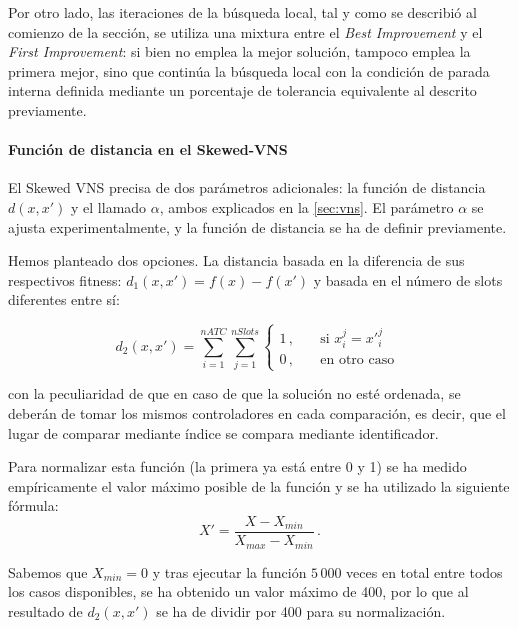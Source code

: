 Por otro lado, las iteraciones de la búsqueda local, tal y como se describió al comienzo de la sección, se utiliza una mixtura entre el \textit{Best Improvement} y el \textit{First Improvement}: si bien no emplea la mejor solución, tampoco emplea la primera mejor, sino que continúa la búsqueda local con la condición de parada interna definida mediante un porcentaje de tolerancia equivalente al descrito previamente.

\paragraph{Función de distancia en el Skewed-VNS}
El Skewed VNS precisa de dos parámetros adicionales: la función de distancia $d(x,x')$ y el llamado $\alpha$, ambos explicados en la \autoref{sec:vns}. El parámetro $\alpha$ se ajusta experimentalmente, y la función de distancia se ha de definir previamente.

\begin{minipage}{\textwidth}
Hemos planteado dos opciones. La distancia basada en la diferencia de sus respectivos fitness: $d_1(x,x')=f(x)-f(x')$ y basada en el número de slots diferentes entre sí:

\[
d_2(x,x')=\sum_{i=1}^{nATC} \sum_{j=1}^{nSlots}
\begin{cases}
    1\,, & \quad \textrm{si } x_i^j = {x'}_i^j \\
    0\,, & \quad \textrm{en otro caso }
\end{cases}
\]

\end{minipage}

con la peculiaridad de que en caso de que la solución no esté ordenada, se deberán de tomar los mismos controladores en cada comparación, es decir, que el lugar de comparar mediante índice se compara mediante identificador.

Para normalizar esta función (la primera ya está entre 0 y 1) se ha medido empíricamente el valor máximo posible de la función
y se ha utilizado la siguiente fórmula:
\[
    X' = \frac{X-X_{min}}{X_{max}-X_{min}} \,.
\]

Sabemos que $X_{min}=0$ y tras ejecutar la función $5\,000$ veces en total entre todos los casos disponibles, se ha obtenido un valor máximo de 400, por lo que al resultado de $d_2(x,x')$ se ha de dividir por 400 para su normalización.